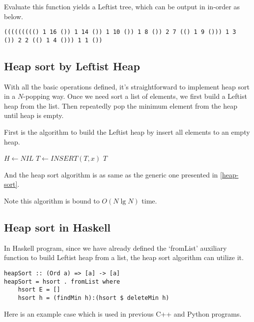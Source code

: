 \documentclass{article}
\begin{document}
Evaluate this function yields a Leftist tree, which can be output
in in-order as below.

\begin{lstlisting}
((((((((() 1 16 ()) 1 14 ()) 1 10 ()) 1 8 ()) 2 7 (() 1 9 ())) 1 3
()) 2 2 (() 1 4 ())) 1 1 ())
\end{lstlisting}

\subsection{Heap sort by Leftist Heap}

With all the basic operations defined, it's straightforward to
implement heap sort in a $N$-popping way. Once we need sort a
list of elements, we first build a Leftist heap from the list.
Then repeatedly pop the minimum element from the heap until heap
is empty.

First is the algorithm to build the Leftist heap by insert all
elements to an empty heap.

\begin{algorithmic}[1]
  \State $H \gets NIL$
    \State $T \gets INSERT(T, x)$
  \EndFor
  \State \Return $T$
\EndFunction
\end{algorithmic}

And the heap sort algorithm is as same as the generic one presented
in \ref{heap-sort}.

Note this algorithm is bound to $O(N \lg N)$ time.

\subsection*{Heap sort in Haskell}

In Haskell program, since we have already defined the `fromList'
auxiliary function to build Leftist heap from a list, the heap sort
algorithm can utilize it.

\lstset{language=Haskell}
\begin{lstlisting}
heapSort :: (Ord a) => [a] -> [a]
heapSort = hsort . fromList where
    hsort E = []
    hsort h = (findMin h):(hsort $ deleteMin h)
\end{lstlisting} %

Here is an example case which is used in previous C++ and Python
programs.
\end{document}
